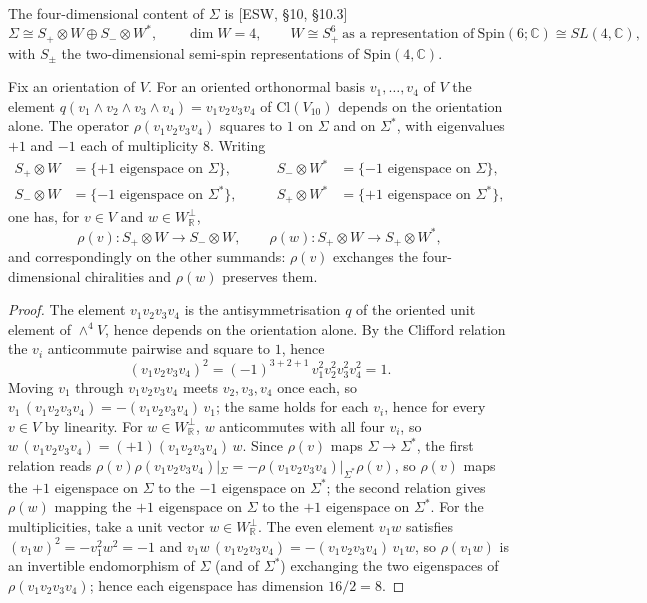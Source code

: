 The four-dimensional content of $\Sigma$ is [ESW, §10, §10.3]
\[
\Sigma\cong S_+\otimes W\oplus S_-\otimes W^*,\qquad \dim W=4,\qquad W\cong S_+^6\ \text{as a representation of}\ \mathrm{Spin}(6;\mathbb C)\cong SL(4,\mathbb C),
\]
with $S_\pm$ the two-dimensional semi-spin representations of $\mathrm{Spin}(4,\mathbb C)$.

\begin{proposition}
\label{prop:c1-chirality}
Fix an orientation of $V$. For an oriented orthonormal basis $v_1,\dots,v_4$ of $V$ the element $q(v_1\wedge v_2\wedge v_3\wedge v_4)=v_1v_2v_3v_4$ of $\mathrm{Cl}(V_{10})$ depends on the orientation alone. The operator $\rho(v_1v_2v_3v_4)$ squares to $1$ on $\Sigma$ and on $\Sigma^*$, with eigenvalues $+1$ and $-1$ each of multiplicity $8$. Writing
\[
\begin{aligned}
S_+\otimes W&=\{+1\text{ eigenspace on }\Sigma\},&\qquad S_-\otimes W^*&=\{-1\text{ eigenspace on }\Sigma\},\\
S_-\otimes W&=\{-1\text{ eigenspace on }\Sigma^*\},&\qquad S_+\otimes W^*&=\{+1\text{ eigenspace on }\Sigma^*\},
\end{aligned}
\]
one has, for $v\in V$ and $w\in W_{\mathbb R}^\perp$,
\[
\rho(v)\colon S_+\otimes W\to S_-\otimes W,\qquad \rho(w)\colon S_+\otimes W\to S_+\otimes W^*,
\]
and correspondingly on the other summands: $\rho(v)$ exchanges the four-dimensional chiralities and $\rho(w)$ preserves them.
\end{proposition}

\begin{proof}
The element $v_1v_2v_3v_4$ is the antisymmetrisation $q$ of the oriented unit element of $\wedge^4V$, hence depends on the orientation alone. By the Clifford relation the $v_i$ anticommute pairwise and square to $1$, hence
\[
(v_1v_2v_3v_4)^2=(-1)^{3+2+1}\,v_1^2v_2^2v_3^2v_4^2=1 .
\]
Moving $v_1$ through $v_1v_2v_3v_4$ meets $v_2,v_3,v_4$ once each, so $v_1\,(v_1v_2v_3v_4)=-(v_1v_2v_3v_4)\,v_1$; the same holds for each $v_i$, hence for every $v\in V$ by linearity. For $w\in W_{\mathbb R}^\perp$, $w$ anticommutes with all four $v_i$, so $w\,(v_1v_2v_3v_4)=(+1)(v_1v_2v_3v_4)\,w$. Since $\rho(v)$ maps $\Sigma\to\Sigma^*$, the first relation reads $\rho(v)\rho(v_1v_2v_3v_4)|_{\Sigma}=-\rho(v_1v_2v_3v_4)|_{\Sigma^*}\rho(v)$, so $\rho(v)$ maps the $+1$ eigenspace on $\Sigma$ to the $-1$ eigenspace on $\Sigma^*$; the second relation gives $\rho(w)$ mapping the $+1$ eigenspace on $\Sigma$ to the $+1$ eigenspace on $\Sigma^*$. For the multiplicities, take a unit vector $w\in W_{\mathbb R}^\perp$. The even element $v_1w$ satisfies $(v_1w)^2=-v_1^2w^2=-1$ and $v_1w\,(v_1v_2v_3v_4)=-(v_1v_2v_3v_4)\,v_1w$, so $\rho(v_1w)$ is an invertible endomorphism of $\Sigma$ (and of $\Sigma^*$) exchanging the two eigenspaces of $\rho(v_1v_2v_3v_4)$; hence each eigenspace has dimension $16/2=8$.
\end{proof}

